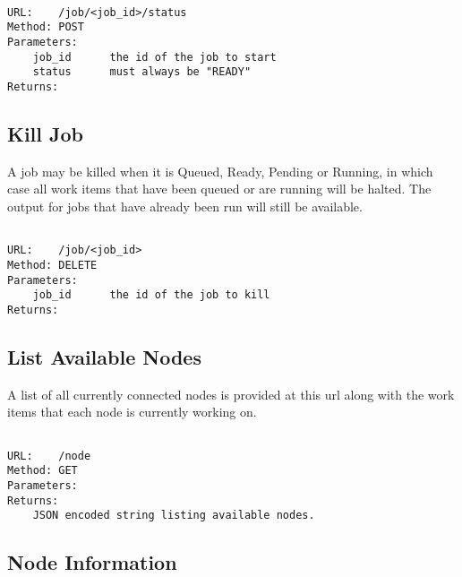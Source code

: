 \begin{adjustwidth}{2.5em}{2.5em}
\begin{verbatim}

URL:    /job/<job_id>/status
Method: POST
Parameters: 
    job_id      the id of the job to start
    status      must always be "READY"
Returns:

\end{verbatim}
\end{adjustwidth}

\subsection{Kill Job}
\label{killjob}

A job may be killed when it is Queued, Ready, Pending or Running, in which case all work items that have been queued or are running will be halted. The output for jobs that have already been run will still be available.

\begin{adjustwidth}{2.5em}{2.5em}
\begin{verbatim}

URL:    /job/<job_id>
Method: DELETE
Parameters: 
    job_id      the id of the job to kill
Returns:

\end{verbatim}
\end{adjustwidth}

\subsection{List Available Nodes}
\label{listavailablenodes}

A list of all currently connected nodes is provided at this url along with the work items that each node is currently working on.

\begin{adjustwidth}{2.5em}{2.5em}
\begin{verbatim}

URL:    /node
Method: GET
Parameters:
Returns:    
    JSON encoded string listing available nodes.

\end{verbatim}
\end{adjustwidth}

\subsection{Node Information}
\label{nodeinformation}

